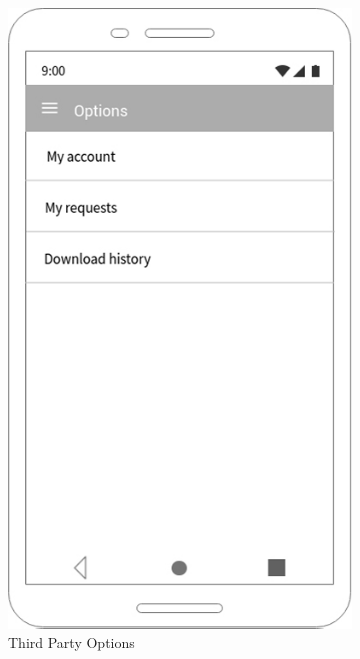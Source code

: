 \begin{figure}[h!]
 \centering
  \begin{subfigure}[b]{0.4\linewidth}
    \includegraphics[width=\linewidth]{img/mockup/tp_options.jpg}
    \caption{Third Party Options}
  \end{subfigure}
 ~ ~ ~ ~ ~ ~ 
  \begin{subfigure}[b]{0.4\linewidth}

\end{subfigure}
\end{figure}
